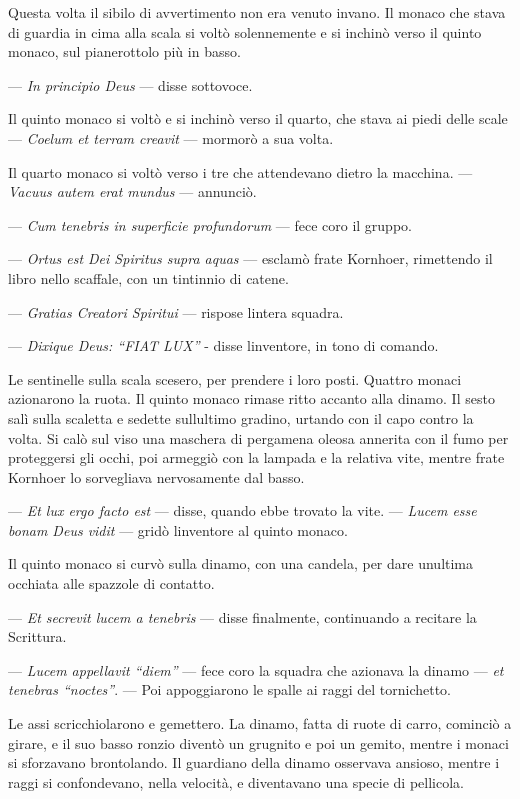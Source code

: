 Questa volta il sibilo di avvertimento non era venuto invano. Il monaco
che stava di guardia in cima alla scala si voltò solennemente e si
inchinò verso il quinto monaco, sul pianerottolo più in basso.

--- \emph{In principio Deus} --- disse sottovoce.

Il quinto monaco si voltò e si inchinò verso il quarto, che stava ai
piedi delle scale --- \emph{Coelum et terram creavit} --- mormorò a sua
volta.

Il quarto monaco si voltò verso i tre che attendevano dietro la
macchina. --- \emph{Vacuus autem erat mundus} --- annunciò.

--- \emph{Cum tenebris in superficie profundorum} --- fece coro il
gruppo.

--- \emph{Ortus est Dei Spiritus supra aquas} --- esclamò frate
Kornhoer, rimettendo il libro nello scaffale, con un tintinnio di
catene.

--- \emph{Gratias Creatori Spiritui} --- rispose
l\textquotesingle intera squadra.

--- \emph{Dixique Deus: ``FIAT LUX''} - disse
l\textquotesingle inventore, in tono di comando.

Le sentinelle sulla scala scesero, per prendere i loro posti. Quattro
monaci azionarono la ruota. Il quinto monaco rimase ritto accanto alla
dinamo. Il sesto salì sulla scaletta e sedette
sull\textquotesingle ultimo gradino, urtando con il capo contro la
volta. Si calò sul viso una maschera di pergamena oleosa annerita con il
fumo per proteggersi gli occhi, poi armeggiò con la lampada e la
relativa vite, mentre frate Kornhoer lo sorvegliava nervosamente dal
basso.

--- \emph{Et lux ergo facto est} --- disse, quando ebbe trovato la vite.
--- \emph{Lucem esse bonam Deus vidit} --- gridò
l\textquotesingle inventore al quinto monaco.

Il quinto monaco si curvò sulla dinamo, con una candela, per dare
un\textquotesingle ultima occhiata alle spazzole di contatto.

--- \emph{Et secrevit lucem a tenebris} --- disse finalmente,
continuando a recitare la Scrittura.

--- \emph{Lucem appellavit ``diem''} --- fece coro la squadra che
azionava la dinamo --- \emph{et tenebras ``noctes''}. --- Poi
appoggiarono le spalle ai raggi del tornichetto.

Le assi scricchiolarono e gemettero. La dinamo, fatta di ruote di carro,
cominciò a girare, e il suo basso ronzio diventò un grugnito e poi un
gemito, mentre i monaci si sforzavano brontolando. Il guardiano della
dinamo osservava ansioso, mentre i raggi si confondevano, nella
velocità, e diventavano una specie di pellicola.

